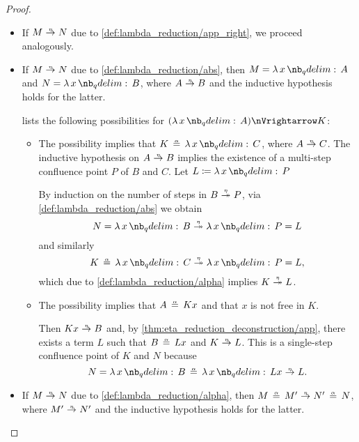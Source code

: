 \begin{proof}
\begin{itemize}
    \item If \( M \ered N \) due to \ref{def:lambda_reduction/app_right}, we proceed analogously.

    \item If \( M \ered N \) due to \ref{def:lambda_reduction/abs}, then \( M = \qabs x A \) and \( N = \qabs x B \), where \( A \ered B \) and the inductive hypothesis holds for the latter.

     lists the following possibilities for \( (\qabs x A) \pred K \):
    \begin{itemize}
      \item The possibility  implies that \( K \aequiv \qabs x C \), where \( A \ered C \). The inductive hypothesis on \( A \ered B \) implies the existence of a multi-step confluence point \( P \) of \( B \) and \( C \). Let \( L \coloneqq \qabs x P \)

      By induction on the number of steps in \( B \ered* P \), via \ref{def:lambda_reduction/abs} we obtain
      \begin{equation*}
        N = \qabs x B \ered* \qabs x P = L
      \end{equation*}
      and similarly
      \begin{equation*}
        K \aequiv \qabs x C \ered* \qabs x P = L,
      \end{equation*}
      which due to \ref{def:lambda_reduction/alpha} implies \( K \ered* L \).

      \item The possibility  implies that \( A \aequiv Kx \) and that \( x \) is not free in \( K \).

      Then \( Kx \ered B \) and, by \ref{thm:eta_reduction_deconstruction/app}, there exists a term \( L \) such that \( B \aequiv Lx \) and \( K \ered L \). This is a single-step confluence point of \( K \) and \( N \) because
      \begin{equation*}
        N
        =
        \qabs x B
        \aequiv
        \qabs x L x
        \ered
        L.
      \end{equation*}
    \end{itemize}

    \item If \( M \ered N \) due to \ref{def:lambda_reduction/alpha}, then \( M \aequiv M' \ered N' \aequiv N \), where \( M' \ered N' \) and the inductive hypothesis holds for the latter.


\end{itemize}
\end{proof}
